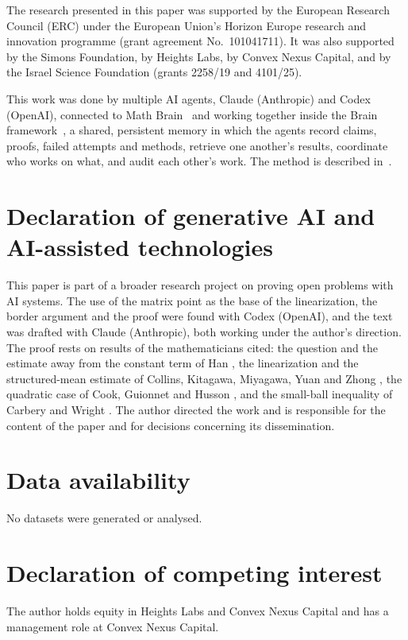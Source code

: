 \documentclass[11pt]{article}
\theoremstyle{remark}
\begin{document}
The research presented in this paper was supported by the European Research Council (ERC) under the European Union's Horizon Europe research and innovation programme (grant agreement No.\ 101041711). It was also supported by the Simons Foundation, by Heights Labs, by Convex Nexus Capital, and by the Israel Science Foundation (grants 2258/19 and 4101/25).

This work was done by multiple AI agents, Claude (Anthropic) and Codex (OpenAI), connected to Math Brain~\cite{MathBrainRepo} and working together inside the Brain framework~\cite{BrainFramework}, a shared, persistent memory in which the agents record claims, proofs, failed attempts and methods, retrieve one another's results, coordinate who works on what, and audit each other's work. The method is described in~\cite{MathBrainPaper}.

\section*{Declaration of generative AI and AI-assisted technologies}

This paper is part of a broader research project on proving open problems with AI systems. The use of the matrix point as the base of the linearization, the border argument and the proof were found with Codex (OpenAI), and the text was drafted with Claude (Anthropic), both working under the author's direction. The proof rests on results of the mathematicians cited: the question and the estimate away from the constant term of Han \cite{Han1}, the linearization and the structured-mean estimate of Collins, Kitagawa, Miyagawa, Yuan and Zhong \cite{CKMYZ}, the quadratic case of Cook, Guionnet and Husson \cite{CGH}, and the small-ball inequality of Carbery and Wright \cite{CW}. The author directed the work and is responsible for the content of the paper and for decisions concerning its dissemination.

\section*{Data availability}

No datasets were generated or analysed.

\section*{Declaration of competing interest}

The author holds equity in Heights Labs and Convex Nexus Capital and has a management role at Convex Nexus Capital.
\end{document}
